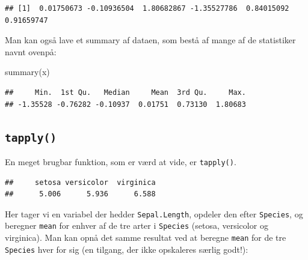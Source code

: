\documentclass[
]{book}
\newenvironment{Shaded}{\begin{snugshade}}{\end{snugshade}}
\newcommand{\CommentTok}[1]{\textcolor[rgb]{0.56,0.35,0.01}{\textit{#1}}}
\newcommand{\FunctionTok}[1]{\textcolor[rgb]{0.00,0.00,0.00}{#1}}
\newcommand{\NormalTok}[1]{#1}
\newcommand{\SpecialCharTok}[1]{\textcolor[rgb]{0.00,0.00,0.00}{#1}}
\begin{document}
\begin{verbatim}
## [1]  0.01750673 -0.10936504  1.80682867 -1.35527786  0.84015092  0.91659747
\end{verbatim}

Man kan også lave et summary af dataen, som bestå af mange af de statistiker navnt ovenpå:

\begin{Shaded}
\begin{Highlighting}[]
\FunctionTok{summary}\NormalTok{(x)}
\end{Highlighting}
\end{Shaded}

\begin{verbatim}
##     Min.  1st Qu.   Median     Mean  3rd Qu.     Max. 
## -1.35528 -0.76282 -0.10937  0.01751  0.73130  1.80683
\end{verbatim}

\hypertarget{tapply}{%
\subsection{\texorpdfstring{\texttt{tapply()}}{tapply()}}\label{tapply}}

En meget brugbar funktion, som er værd at vide, er \texttt{tapply()}.

\begin{Shaded}
\end{Shaded}

\begin{verbatim}
##     setosa versicolor  virginica 
##      5.006      5.936      6.588
\end{verbatim}

Her tager vi en variabel der hedder \texttt{Sepal.Length}, opdeler den efter \texttt{Species}, og beregner \texttt{mean} for enhver af de tre arter i \texttt{Species} (setosa, versicolor og virginica). Man kan opnå det samme resultat ved at beregne \texttt{mean} for de tre \texttt{Species} hver for sig (en tilgang, der ikke opskaleres særlig godt!):
\end{document}

